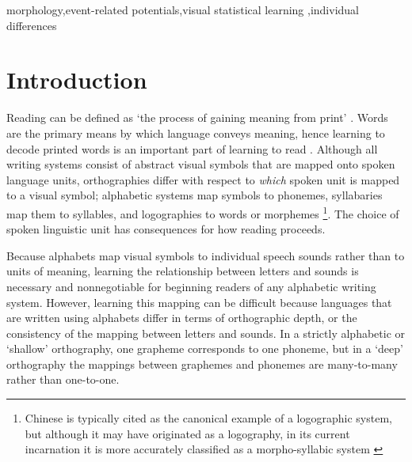 \documentclass[review]{elsarticle}
\begin{document}
\begin{frontmatter}

\begin{keyword}
 morphology\sep event-related potentials\sep visual statistical learning \sep individual differences
\end{keyword}

\end{frontmatter}

\linenumbers

\section{Introduction}

Reading can be defined as `the process of gaining meaning from print' \citep[][p. 34]{raynerHowPsychologicalScience2001}. Words are the primary means by which language conveys meaning, hence learning to decode printed words is an important part of learning to read \citep[e.g.,][]{castlesEndingReadingWars2018}.  Although all writing systems consist of abstract visual symbols that are mapped onto spoken language units, orthographies differ with respect to \textit{which} spoken unit is mapped to a visual symbol; alphabetic systems map symbols to phonemes, syllabaries  map them to syllables, and logographies to words or morphemes \footnote{Chinese is typically cited as the canonical example of a logographic system, but although it may have originated as a logography, in its current incarnation it is more accurately classified as a morpho-syllabic system \citep{raynerHowPsychologicalScience2001}}.  The choice of spoken linguistic unit has consequences for how reading proceeds. 

Because alphabets map visual symbols to individual speech sounds rather than to units of meaning,  learning the relationship between letters and sounds is necessary and nonnegotiable for beginning readers of any alphabetic writing system.  However, learning this mapping can be difficult because languages that are written using alphabets differ in terms of orthographic depth, or the consistency of the mapping between letters and sounds. In a strictly alphabetic or ‘shallow’ orthography, one grapheme corresponds to one phoneme, but in a ‘deep’ orthography the mappings between graphemes and phonemes  are many-to-many rather than one-to-one. 
\end{document}
